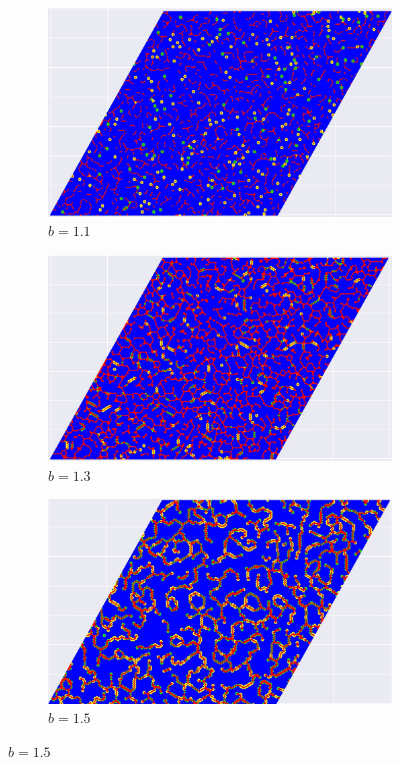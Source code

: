 \documentclass[12pt]{article}
\begin{document}
        \begin{figure}[!htbp]
            \centering
            \captionsetup{justification=centering}
            \begin{subfigure}{.33\textwidth}
            \centering
            \includegraphics[width=.9\linewidth]{TriangularMeanFieldGame/triangular_snapshot_b=11.jpg}
            \caption{$b=1.1$}
            \label{fig:trsub1}
            \end{subfigure}%
            \begin{subfigure}{.33\textwidth}
            \centering
            \includegraphics[width=.9\linewidth]{TriangularMeanFieldGame/triangular_snapshot_b=13.jpg}
            \caption{$b=1.3$}
            \label{fig:trsub2}
            \end{subfigure}%
            \begin{subfigure}{.33\textwidth}
            \centering
            \includegraphics[width=.9\linewidth]{TriangularMeanFieldGame/triangular_snapshot_b=15.jpg}
            \caption{$b=1.5$}
            \label{fig:trsub3}
            \end{subfigure}
            

\end{figure}
\end{document}
